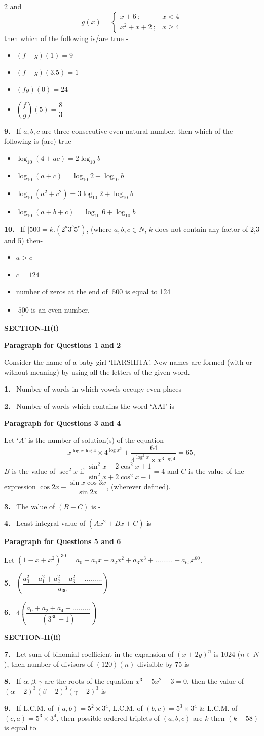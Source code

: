 \documentclass[10pt]{extarticle}
\newcommand{\sect}[1]{\par\smallskip\noindent\textbf{#1}\par}
\newcommand{\qn}[1]{\par\smallskip\noindent\textbf{#1.}~}
\newcommand{\paraq}[2]{\par\smallskip\noindent\textbf{Paragraph for Questions #1 and #2}\par}
\newenvironment{qoptions}{\begin{itemize}[leftmargin=1.8em,itemsep=1pt,topsep=2pt,label={}]}{\end{itemize}}
\newcommand{\opt}[2]{\item[(#1)] #2}
\begin{document}
\begin{multicols}{2}
and
\[g(x)=\begin{cases}x+6\ ;&x<4\\ x^2+x+2\ ;&x\ge4\end{cases}\]
then which of the following is/are true -
\begin{qoptions}
\opt{A}{$(f+g)(1)=9$}
\opt{B}{$(f-g)(3.5)=1$}
\opt{C}{$(fg)(0)=24$}
\opt{D}{$\left(\dfrac fg\right)(5)=\dfrac83$}
\end{qoptions}
\qn{9} If $a,b,c$ are three consecutive even natural number, then which of the following is (are) true -
\begin{qoptions}
\opt{A}{$\log_{10}(4+ac)=2\log_{10}b$}
\opt{B}{$\log_{10}(a+c)=\log_{10}2+\log_{10}b$}
\opt{C}{$\log_{10}(a^2+c^2)=3\log_{10}2+\log_{10}b$}
\opt{D}{$\log_{10}(a+b+c)=\log_{10}6+\log_{10}b$}
\end{qoptions}
\qn{10} If $\underline{|500}=k.\left(2^a3^b5^c\right)$, (where $a,b,c\in N$, $k$ does not contain any factor of 2,3 and 5) then-
\begin{qoptions}
\opt{A}{$a>c$}
\opt{B}{$c=124$}
\opt{C}{number of zeros at the end of $\underline{|500}$ is equal to 124}
\opt{D}{$\underline{|500}$ is an even number.}
\end{qoptions}
\sect{SECTION-II(i)}
\paraq{1}{2}
Consider the name of a baby girl `HARSHITA'. New names are formed (with or without meaning) by using all the letters of the given word.
\qn{1} Number of words in which vowels occupy even places -
\qn{2} Number of words which contains the word `AAI' is-
\paraq{3}{4}
Let `$A$' is the number of solution(s) of the equation
\[x^{\log x\,\log 4}\times4^{\log x^3}+\dfrac{64}{4^{\log^2x}\times x^{3\log4}}=65,\]
$B$ is the value of $\sec^2x$ if $\dfrac{\sin^2x-2\cos^2x+1}{\sin^2x+2\cos^2x-1}=4$ and $C$ is the value of the expression $\cos2x-\dfrac{\sin x\cos3x}{\sin2x}$, (wherever defined).
\qn{3} The value of $(B+C)$ is -
\qn{4} Least integral value of $(Ax^2+Bx+C)$ is -
\paraq{5}{6}
Let $(1-x+x^2)^{30}=a_0+a_1x+a_2x^2+a_3x^3+\dots\dots\dots+a_{60}x^{60}$.
\qn{5} $\left(\dfrac{a_0^2-a_1^2+a_2^2-a_3^2+\dots\dots\dots}{a_{30}}\right)$
\qn{6} $4\left(\dfrac{a_0+a_2+a_4+\dots\dots\dots}{(3^{30}+1)}\right)$
\sect{SECTION-II(ii)}
\qn{7} Let sum of binomial coefficient in the expansion of $(x+2y)^n$ is 1024 ($n\in N$), then number of divisors of $(120)(n)$ divisible by 75 is
\qn{8} If $\alpha,\beta,\gamma$ are the roots of the equation $x^3-5x^2+3=0$, then the value of $(\alpha-2)^3(\beta-2)^3(\gamma-2)^3$ is
\qn{9} If L.C.M. of $(a,b)=5^2\times3^4$, L.C.M. of $(b,c)=5^3\times3^4$ \& L.C.M. of $(c,a)=5^3\times3^4$, then possible ordered triplets of $(a,b,c)$ are $k$ then $(k-58)$ is equal to

\end{multicols}
\end{document}
